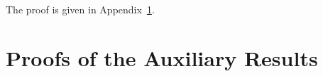 


The proof is given in Appendix~\ref{app:curvature-smoothness}.

\appendix
\section{Proofs of the Auxiliary Results}
\label{app:curvature-smoothness}

